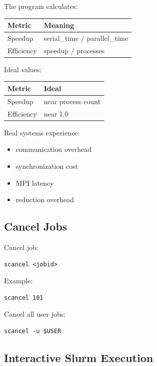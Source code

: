 \documentclass[11pt]{article}
\begin{document}
The program calculates:

\begin{center}
\begin{tabular}{ll}
Metric & Meaning\\
\hline
Speedup & serial\_time / parallel\_time\\
Efficiency & speedup / processes\\
\end{tabular}
\end{center}

Ideal values:

\begin{center}
\begin{tabular}{ll}
Metric & Ideal\\
\hline
Speedup & near process count\\
Efficiency & near 1.0\\
\end{tabular}
\end{center}

Real systems experience:

\begin{itemize}
\item communication overhead
\item synchronization cost
\item MPI latency
\item reduction overhead
\end{itemize}
\subsection{Cancel Jobs}
\label{sec:orge80f1fc}

Cancel job:

\begin{verbatim}
scancel <jobid>
\end{verbatim}

Example:

\begin{verbatim}
scancel 101
\end{verbatim}

Cancel all user jobs:

\begin{verbatim}
scancel -u $USER
\end{verbatim}
\subsection{Interactive Slurm Execution}
\label{sec:orgfe309b6}
\end{document}
